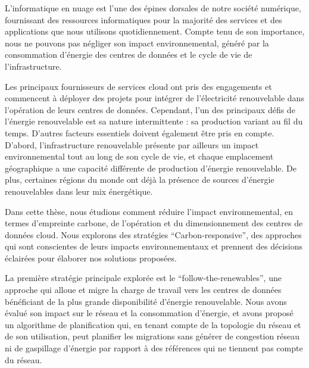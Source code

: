 
L'informatique en nuage est l'une des épines dorsales de notre société numérique, fournissant des ressources informatiques pour la majorité des services et des applications que nous utilisons quotidiennement. Compte tenu de son importance, nous ne pouvons pas négliger son impact environnemental, généré par la consommation d'énergie des centres de données et le cycle de vie de l'infrastructure.

Les principaux fournisseurs de services cloud ont pris des engagements et commencent à déployer des projets pour intégrer de l'électricité renouvelable dans l'opération de leurs centres de données. Cependant, l'un des principaux défis de l'énergie renouvelable est sa nature intermittente : sa production variant au fil du temps. D'autres facteurs essentiels doivent également être pris en compte. D'abord, l'infrastructure renouvelable présente par ailleurs un impact environnemental tout au long de son cycle de vie, et chaque emplacement géographique a une capacité différente de production d'énergie renouvelable. De plus, certaines régions du monde ont déjà la présence de sources d'énergie renouvelables dans leur mix énergétique.

Dans cette thèse, nous étudions comment réduire l'impact environnemental, en termes d'empreinte carbone, de l'opération et du dimensionnement des centres de données cloud. Nous explorons des stratégies ``Carbon-responsive'', des approches qui sont conscientes de leurs impacts environnementaux et prennent des décisions éclairées pour élaborer nos solutions proposées.

La première stratégie principale explorée est le  ``follow-the-renewables'', une approche qui alloue et migre la charge de travail vers les centres de données bénéficiant de la plus grande disponibilité d'énergie renouvelable. Nous avons évalué son impact sur le réseau et la consommation d'énergie, et avons proposé un algorithme de planification qui, en tenant compte de la topologie du réseau et de son utilisation, peut planifier les migrations sans générer de congestion réseau ni de gaspillage d'énergie par rapport à des références qui ne tiennent pas compte du réseau.

